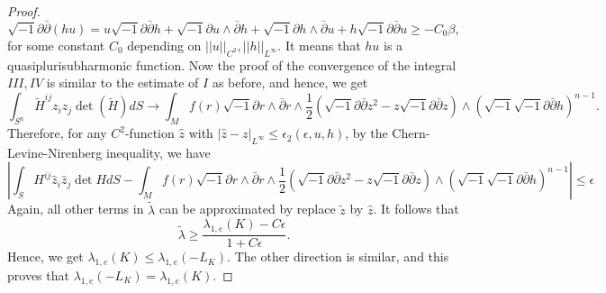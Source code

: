 \documentclass[reqno]{amsart}
\theoremstyle{remark}
\def\p{\partial}
\theoremstyle{plain}
\newcommand{\ddc}{\sqrt{-1}\partial\bar\partial}
\begin{document}
\begin{proof}
\[\ddc(hu)=u\ddc h+\sqrt{-1}\partial u\wedge\bar{\partial}h+\sqrt{-1}\partial{h}\wedge\bar{\partial}u+h\ddc u\geq -C_0\beta,
\] for some constant $C_0$ depending on $||u||_{C^2},||h||_{L^\infty}$. It means that $hu$ is a quasiplurisubharmonic function. Now the proof of the convergence of the integral $III,IV$ is similar to the estimate of $I$ as before, and hence, we get \[
\int_{S^n}\tilde{H}^{ij}z_iz_j\det(\tilde{H})dS\rightarrow \int_{M}f(r)\sqrt{-1}\partial r\wedge\bar{\partial}r\wedge\frac{1}{2}(\ddc z^2-z\ddc z)\wedge(\sqrt{-1}\ddc h)^{n-1}.
\] Therefore, for any $C^2$-function $\hat{z}$ with $|\hat{z}-z|_{L^\infty}\leq \epsilon_2(\epsilon,u,h)$, by the Chern-Levine-Nirenberg inequality, we have \[\left|
\int_{S}H^{ij}\hat{z}_i\hat{z}_j\det HdS-\int_{M}f(r)\sqrt{-1}\partial r\wedge\bar{\partial}r\wedge\frac{1}{2}(\ddc z^2-z\ddc z)\wedge(\sqrt{-1}\ddc h)^{n-1}\right|\leq \epsilon
\] Again, all other terms in $\tilde{\lambda}$ can be approximated by replace $\tilde{z}$ by $\hat{z}$. 
It follows that \[
\tilde{\lambda}\geq \frac{\lambda_{1,e}(K)-C\epsilon}{1+C\epsilon}.
\]Hence, we get
$\lambda_{1,e}(K)\leq \lambda_{1,e}(-L_K)$. The other direction is similar, and this proves that $\lambda_{1,e}(-L_K)=\lambda_{1,e}(K).$
\end{proof}
\end{document}
